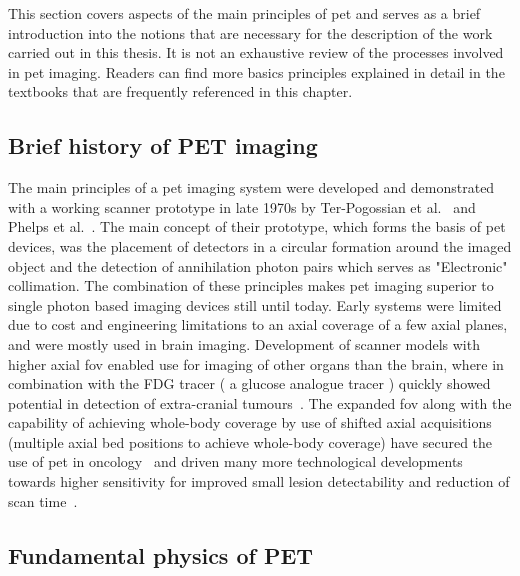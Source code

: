 
This section covers aspects of the main principles of \gls{pet} and serves as a brief introduction into the notions that are necessary for the description of the work carried out in this thesis. It is not an exhaustive review of the processes involved in \gls{pet} imaging. Readers can find more basics principles explained in detail in the textbooks that are frequently referenced in this chapter.

\subsection{Brief history of PET imaging }
The main principles of a \Gls{pet} imaging system were developed and demonstrated with a working scanner prototype in late 1970s by Ter-Pogossian et al.~\cite{Ter-Pogossian1975} and Phelps et al.~\cite{Phelps1975}. The main concept of their prototype, which forms the basis of \gls{pet} devices, was the placement of detectors in a circular formation around the imaged object and the detection of annihilation photon pairs which serves as "Electronic" collimation. The combination of these principles makes \gls{pet} imaging superior to single photon based imaging devices still until today. 
Early systems were limited due to cost and engineering limitations to an axial coverage of a few axial planes, and were mostly used in brain imaging. Development of scanner models with higher axial \gls{fov} enabled use for imaging of other organs than the brain, where in combination with the FDG tracer ( a glucose analogue tracer ) quickly showed potential in detection of extra-cranial tumours~\cite{Nutt2002}.
The expanded \gls{fov} along with the capability of achieving whole-body coverage by use of shifted axial acquisitions~\cite{Dahlbom1992} (multiple axial bed positions to achieve whole-body coverage) have secured the use of \gls{pet} in oncology~\cite{Bomanji2001} and driven many more technological developments towards higher sensitivity for  improved small lesion detectability and reduction of scan time~\cite{Jones2017}.


\subsection{Fundamental physics of PET}

